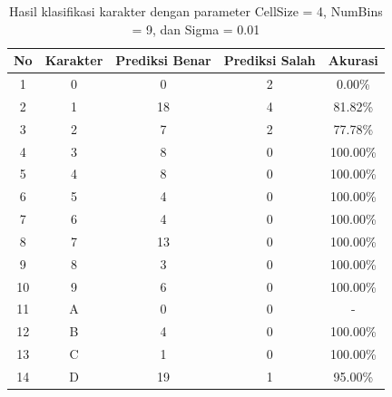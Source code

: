 \begin{longtable}[c]{|c|c|c|c|c|}
	\caption{Hasil klasifikasi karakter dengan parameter CellSize = 4, NumBins = 9, dan Sigma = 0.01}
	\label{tab:hasilklasifikasisel4}\\
	\hline
	\textbf{No} & \textbf{Karakter} & \textbf{Prediksi Benar} & \textbf{Prediksi Salah} & \textbf{Akurasi} \\ \hline
	\endhead
	1           & 0                 & 0                       & 2                       &0.00\%            \\ \hline
	2           & 1                 & 18                       & 4                       &81.82\%            \\ \hline
	3           & 2                 & 7                       & 2                       &77.78\%            \\ \hline
	4           & 3                 & 8                       & 0                       &100.00\%            \\ \hline
	5           & 4                 & 8                       & 0                       &100.00\%            \\ \hline
	6           & 5                 & 4                       & 0                       &100.00\%            \\ \hline
	7           & 6                 & 4                       & 0                       &100.00\%            \\ \hline
	8           & 7                 & 13                       & 0                       &100.00\%            \\ \hline
	9           & 8                 & 3                       & 0                       &100.00\%            \\ \hline
	10           & 9                 & 6                       & 0                       &100.00\%            \\ \hline
	11           & A                 & 0                       & 0                       & -            \\ \hline
	12           & B                 & 4                       & 0                       &100.00\%            \\ \hline
	13           & C                 & 1                       & 0                       &100.00\%            \\ \hline
	14           & D                 & 19                       & 1                       &95.00\%            \\ \hline

\end{longtable}
